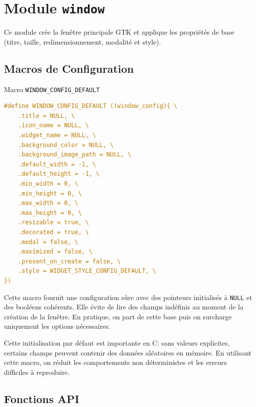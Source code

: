 \section{Module \texttt{window}}

Ce module crée la fenêtre principale GTK et applique les propriétés de base (titre, taille, redimensionnement, modalité et style).

\subsection{Macros de Configuration}

\begin{docbox}{Macro \texttt{WINDOW\_CONFIG\_DEFAULT}}
\begin{lstlisting}[language=C]
#define WINDOW_CONFIG_DEFAULT ((window_config){ \
    .title = NULL, \
    .icon_name = NULL, \
    .widget_name = NULL, \
    .background_color = NULL, \
    .background_image_path = NULL, \
    .default_width = -1, \
    .default_height = -1, \
    .min_width = 0, \
    .min_height = 0, \
    .max_width = 0, \
    .max_height = 0, \
    .resizable = true, \
    .decorated = true, \
    .modal = false, \
    .maximized = false, \
    .present_on_create = false, \
    .style = WIDGET_STYLE_CONFIG_DEFAULT, \
})
\end{lstlisting}
\end{docbox}

Cette macro fournit une configuration sûre avec des pointeurs initialisés à \texttt{NULL} et des booléens cohérents. Elle évite de lire des champs indéfinis au moment de la création de la fenêtre. En pratique, on part de cette base puis on surcharge uniquement les options nécessaires.

Cette initialisation par défaut est importante en C: sans valeurs explicites, certains champs peuvent contenir des données aléatoires en mémoire. En utilisant cette macro, on réduit les comportements non déterministes et les erreurs difficiles à reproduire.

\subsection{Fonctions API}

